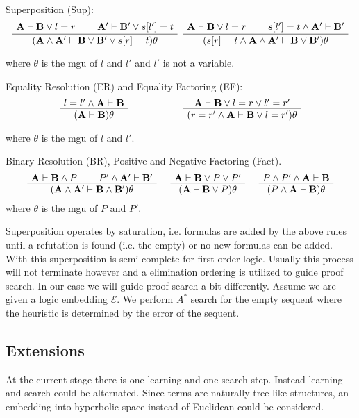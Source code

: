\documentclass[11pt]{article}
\theoremstyle{definition}
\theoremstyle{definition}
\theoremstyle{definition}
\theoremstyle{definition}
\theoremstyle{definition}
\theoremstyle{definition}
\theoremstyle{definition}
\newcommand{\E}{\mathcal{E}}
\newcommand{\A}{\mathbf A}
\newcommand{\B}{\mathbf B}
\begin{document}
	Superposition (Sup):
	\[
	\AxiomC{$\A\vdash \B\vee l=r$}
	\AxiomC{$\A'\vdash \B'\vee s[l']=t$}
	\BinaryInfC{$(\A\wedge\A'\vdash \B\vee\B'\vee s[r] = t)\theta$}
	\DisplayProof
	\hspace*{.2cm}
	\AxiomC{$\A\vdash \B\vee l=r$}
	\AxiomC{$s[l']=t\wedge\A'\vdash \B'$}
	\BinaryInfC{$(s[r] = t\wedge\A\wedge\A'\vdash \B\vee\B')\theta$}
	\DisplayProof
	\]
	
	\noindent where $\theta$ is the mgu of $l$ and $l'$ and $l'$ is not a variable.
	
	Equality Resolution (ER) and Equality Factoring (EF):
	\[
	\AxiomC{$l=l'\wedge\A\vdash \B$}
	\UnaryInfC{$(\A\vdash \B)\theta$}
	\DisplayProof
	\hspace*{2cm}
	\AxiomC{$\A\vdash \B\vee l=r\vee l'=r'$}
	\UnaryInfC{$(r=r'\wedge\A\vdash \B\vee l=r')\theta$}
	\DisplayProof
	\]
	
	\noindent where $\theta$ is the mgu of $l$ and $l'$.
	
	Binary Resolution (BR), Positive and Negative Factoring (Fact).
	\[
	\AxiomC{$\A\vdash \B\wedge P$}
	\AxiomC{$P'\wedge\A'\vdash \B'$}
	\BinaryInfC{$(\A\wedge \A'\vdash \B\wedge \B')\theta$}
	\DisplayProof
	\hspace*{.5cm}
	\AxiomC{$\A\vdash \B\vee P\vee P'$}
	\UnaryInfC{$(\A\vdash \B\vee P)\theta$}
	\DisplayProof
	\hspace*{.5cm}
	\AxiomC{$P\wedge P'\wedge\A\vdash \B$}
	\UnaryInfC{$(P\wedge\A\vdash \B)\theta$}
	\DisplayProof
	\]
	\noindent where $\theta$ is the mgu of $P$ and $P'$.
	
	Superposition operates by saturation, i.e. formulas are added by the above rules until a refutation is found (i.e. the empty) or no new formulas can be added. With this superposition is semi-complete for first-order logic. Usually this process will not terminate however and a elimination ordering is utilized to guide proof search. In our case we will guide proof search a bit differently. Assume we are given a logic embedding $\E$. We perform $A^*$ search for the empty sequent where the heuristic is determined by the error of the sequent.

	\subsection{Extensions}

	At the current stage there is one learning and one search step. Instead learning and search could be alternated. Since terms are naturally tree-like structures, an embedding into hyperbolic space instead of Euclidean could be considered.
\end{document}

